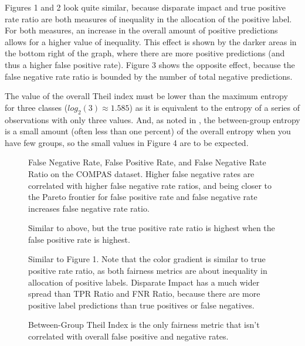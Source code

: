 \documentclass[twoside]{article}
\begin{document}
Figures 1 and 2 look quite similar, because disparate impact and true positive rate ratio are both measures of inequality in the allocation of the positive label. For both measures, an increase in the overall amount of positive predictions allows for a higher value of inequality. This effect is shown by the darker areas in the bottom right of the graph, where there are more positive predictions (and thus a higher false positive rate). Figure 3 shows the opposite effect, because the false negative rate ratio is bounded by the number of total negative predictions.

The value of the overall Theil index must be lower than the maximum entropy for three classes ($log_2(3) \approx 1.585$) as it is equivalent to the entropy of a series of observations with only three values. And, as noted in \citep{Speicher:2018}, the between-group entropy is a small amount (often less than one percent) of the overall entropy when you have few groups, so the small values in Figure 4 are to be expected.


\newcommand{\fig}[2]{
	\begin{figure}[t]{
		\centering{
			\texttt{[image: \#1]}
		}
		\caption{#2}
	}
	\end{figure}
}

\newcommand{\figures}[4]{
	\begin{figure}[H]{
		\centering{
			\texttt{[image: \#1]}
		}
		\caption{#2}
		}
	\end{figure}
	\begin{figure}[H] {
		\centering{
			\texttt{[image: \#3]}
		}
		\caption{#4}
	}
	\end{figure}
}

\figures{FNR Ratio|COMPAS.png}{False Negative Rate, False Positive Rate, and False Negative Rate Ratio on the COMPAS dataset. Higher false negative rates are correlated with higher false negative rate ratios, and being closer to the Pareto frontier for false positive rate and false negative rate increases false negative rate ratio.}{TPR Ratio|COMPAS.png}{Similar to above, but the true positive rate ratio is highest when the false positive rate is highest.}

\figures{Disparate Impact|COMPAS.png}{Similar to Figure 1. Note that the color gradient is similar to true positive rate ratio, as both fairness metrics are about inequality in allocation of positive labels. Disparate Impact has a much wider spread than TPR Ratio and FNR Ratio, because there are more positive label predictions than true positives or false negatives.}{Between-Group Theil Index|COMPAS.png}{Between-Group Theil Index is the only fairness metric that isn't correlated with overall false positive and negative rates.}
\end{document}
